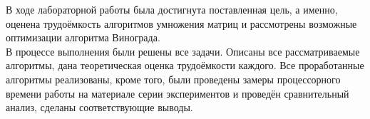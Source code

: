 В ходе лабораторной работы была достигнута поставленная цель, а именно, оценена трудоёмкость алгоритмов умножения матриц и рассмотрены возможные оптимизации алгоритма Винограда.  \\

В процессе выполнения были решены все задачи. Описаны все рассматриваемые алгоритмы, дана теоретическая оценка трудоёмкости каждого. Все проработанные алгоритмы реализованы, кроме того, были проведены замеры процессорного времени работы на материале серии экспериментов и проведён сравнительный анализ, сделаны соответствующие выводы.
